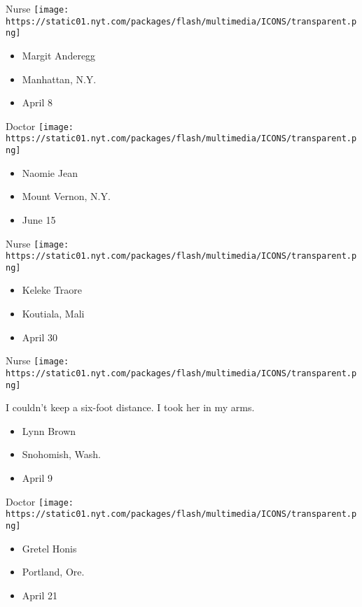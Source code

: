\protect\hyperlink{item-margit-anderegg}{}

Nurse
\texttt{[image: https://static01.nyt.com/packages/flash/multimedia/ICONS/transparent.png]}

\begin{itemize}
\tightlist
\item
  Margit Anderegg
\item
  Manhattan, N.Y.
\item
  April 8
\end{itemize}

\protect\hyperlink{item-naomie-jean}{}

Doctor
\texttt{[image: https://static01.nyt.com/packages/flash/multimedia/ICONS/transparent.png]}

\begin{itemize}
\tightlist
\item
  Naomie Jean
\item
  Mount Vernon, N.Y.
\item
  June 15
\end{itemize}

\protect\hyperlink{item-keleke-traore}{}

Nurse
\texttt{[image: https://static01.nyt.com/packages/flash/multimedia/ICONS/transparent.png]}

\begin{itemize}
\tightlist
\item
  Keleke Traore
\item
  Koutiala, Mali
\item
  April 30
\end{itemize}

\protect\hyperlink{item-lynn-brown}{}

Nurse
\texttt{[image: https://static01.nyt.com/packages/flash/multimedia/ICONS/transparent.png]}

I couldn't keep a six-foot distance. I took her in my arms.

\begin{itemize}
\tightlist
\item
  Lynn Brown
\item
  Snohomish, Wash.
\item
  April 9
\end{itemize}

\protect\hyperlink{item-gretel-honis}{}

Doctor
\texttt{[image: https://static01.nyt.com/packages/flash/multimedia/ICONS/transparent.png]}

\begin{itemize}
\tightlist
\item
  Gretel Honis
\item
  Portland, Ore.
\item
  April 21
\end{itemize}

